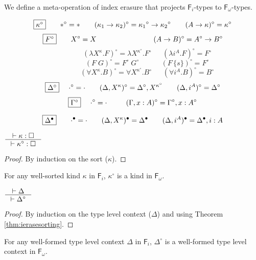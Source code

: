 \documentclass{llncs}
\newcommand{\Fi}{\ensuremath{\mathsf{F}_i}}
\newcommand{\Fw}{\ensuremath{\mathsf{F}_\omega}}
\begin{document}
We define a meta-operation of index erasure that projects $\Fi$-types
to $\Fw$-types.

\begin{definition}\label{def:ierase}
\[ \fbox{$\kappa^\circ$}
 ~~~~ ~~
 *^\circ =
 *
 ~~~~ ~~
 (\kappa_1 -> \kappa_2)^\circ =
 {\kappa_1}^\circ -> {\kappa_2}^\circ
 ~~~~ ~~
 (A -> \kappa)^\circ =
 \kappa^\circ
\]
\[ \fbox{$F^\circ$}
 ~~~~ ~~
 X^\circ =
 X
 ~~~~ ~~~~ ~~~~ ~~~~ ~~~~ ~~~~
 (A -> B)^\circ =
 A^\circ -> B^\circ
\]
\[ \qquad \qquad
 (\lambda X^\kappa.F)^\circ =
 \lambda X^{\kappa^\circ}.F^\circ
 ~~~~ ~~~
 (\lambda i^A.F)^\circ =
 F^\circ
\]
\[ \qquad \qquad
 (F\;G)^\circ =
 F^\circ\;G^\circ
 ~~~~ ~~~~ ~~~~ ~~
 (F\,\{s\})^\circ =
 F^\circ
\]
\[ \qquad \qquad
 (\forall X^\kappa . B)^\circ =
 \forall X^{\kappa^\circ} . B^\circ
 ~~~~ ~~~
 (\forall i^A . B)^\circ =
 B^\circ
\]
\[ \fbox{$\Delta^\circ$}
 ~~~~
 \cdot^\circ = \cdot
 ~~~~ ~~
 (\Delta,X^\kappa)^\circ = \Delta^\circ,X^{\kappa^\circ}
 ~~~~ ~~
 (\Delta,i^A)^\circ = \Delta^\circ
\]
\[ \fbox{$\Gamma^\circ$}
 ~~~~
 \cdot^\circ = \cdot
 ~~~~ ~~~~
 (\Gamma,x:A)^\circ = \Gamma^\circ,x:A^\circ
\]
\end{definition}

\begin{definition}
	\[ \fbox{$\Delta^\bullet$} ~~~~ ~~ \cdot^\bullet = \cdot \qquad
	(\Delta,X^\kappa)^\bullet = \Delta^\bullet \qquad
	(\Delta,i^A)^\bullet = \Delta^\bullet,i:A
\]
\end{definition}



\begin{theorem}
\label{thm:ierasesorting}
	$\inference{|- \kappa : \square}{|- \kappa^\circ : \square}$
\end{theorem}
\begin{proof}
	By induction on the sort ($\kappa$).
\end{proof}
\begin{remark}
For any well-sorted kind $\kappa$ in \Fi,
$\kappa^\circ$ is a kind in \Fw.
\end{remark}

\begin{theorem}
\label{thm:ierasetyctx}
$ \inference{|- \Delta}{|- \Delta^\circ} $
\end{theorem}
\begin{proof}
	By induction on the type level context ($\Delta$)
	and using Theorem \ref{thm:ierasesorting}.
\end{proof}
\begin{remark}
For any well-formed type level context $\Delta$ in \Fi,
$\Delta^\circ$ is a well-formed type level context in \Fw.
\end{remark}
\end{document}
